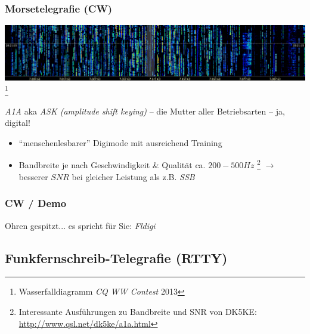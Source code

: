 \begin{frame}
    \frametitle{Morsetelegrafie (CW)}

    \begin{center}
        \includegraphics[width=1\textwidth]{e16/CQWW_2013_CW_Waterfall.png}
        \footnote{Wasserfalldiagramm \emph{CQ WW Contest} 2013}
    \end{center}

    \emph{A1A} aka \emph{ASK (amplitude shift keying)} -- die Mutter aller
    Betriebsarten -- ja, digital!

    \begin{itemize}
        \item ``menschenlesbarer'' Digimode mit ausreichend Training
        \item Bandbreite je nach Geschwindigkeit \& Qualität ca. $200-500 Hz$
              \footnote{Interessante Ausführungen zu Bandbreite und SNR von
              DK5KE: \url{http://www.qsl.net/dk5ke/a1a.html}}
              $\rightarrow$ besserer $SNR$ bei gleicher Leistung als z.B. \emph{SSB}
    \end{itemize}

\end{frame}

\begin{frame}
    \frametitle{CW / Demo}

    \Large{Ohren gespitzt... es spricht für Sie: \emph{Fldigi}}

\end{frame}

\subsection[RTTY]{Funkfernschreib-Telegrafie (RTTY)}

